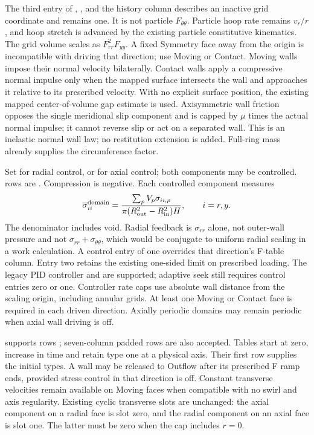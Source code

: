 The third entry of , , and the history column
 describes an inactive grid coordinate and remains one. It is
not particle $F_{\theta\theta}$. Particle hoop rate remains $v_r/r$, and
hoop stretch is advanced by the existing particle constitutive kinematics.
The grid volume scales as $F_{rr}^{2}F_{yy}$. A fixed Symmetry face away from
the origin is incompatible with driving that direction; use Moving or Contact.
Moving walls impose their normal velocity bilaterally. Contact walls apply a
compressive normal impulse only when the mapped surface intersects the wall
and approaches it relative to its prescribed velocity. With no explicit
surface position, the existing mapped center-of-volume gap estimate is used.
Axisymmetric wall friction opposes the single meridional slip component and
is capped by $\mu$ times the actual normal impulse; it cannot reverse slip or
act on a separated wall. This is an inelastic normal wall law; no restitution
extension is added. Full-ring mass already supplies the circumference factor.

Set  for radial control, or
\mpmcode{[0,1,0]} for axial control; both components may be controlled.
 rows are .
Compression is negative. Each controlled component measures
\[
 \overline{\sigma}_{ii}^{\rm domain}
  =\frac{\sum_p V_p\sigma_{ii,p}}
  {\pi(R_{\rm out}^2-R_{\rm in}^2)H},\qquad i=r,y.
\]
The denominator includes void. Radial feedback is $\sigma_{rr}$ alone,
not outer-wall pressure and not $\sigma_{rr}+\sigma_{\theta\theta}$, which
would be conjugate to uniform radial scaling in a work calculation.
A control entry of one overrides that direction's F-table column. Entry two
retains the existing one-sided limit on prescribed loading. The legacy PID
controller and  are supported; adaptive
seek still requires control entries zero or one. Controller rate caps use
absolute wall distance from the scaling origin, including annular grids.
At least one Moving or Contact face is required in each driven direction.
Axially periodic domains may remain periodic when axial wall driving is off.

 supports rows
\mpmcode{[time,r-,r+,y-,y+]}; seven-column padded rows are also accepted.
Tables start at zero, increase in time and retain type one at a physical
axis. Their first row supplies the initial types. A wall may be released to
Outflow after its prescribed F ramp ends, provided stress control in that
direction is off. Constant transverse velocities remain available on Moving faces when
compatible with no swirl and axis regularity. Existing cyclic transverse slots
are unchanged: the axial component on a radial face is slot zero, and the
radial component on an axial face is slot one. The latter must be zero when
the cap includes $r=0$.

